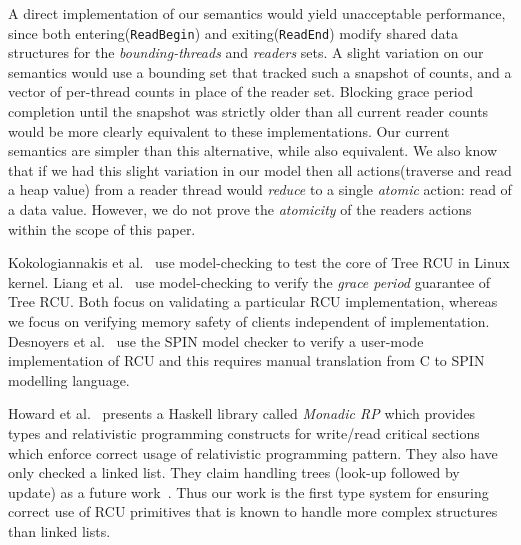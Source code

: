  A direct implementation of our semantics would yield unacceptable performance, since both entering(\lstinline|ReadBegin|) and exiting(\lstinline|ReadEnd|) modify shared data structures for the \textit{bounding-threads} and \textit{readers} sets. A slight variation on our semantics would use a bounding set  that tracked such a snapshot of counts, and a vector of per-thread counts in place of the reader set. Blocking grace period completion until the snapshot was strictly older than all current reader counts would be more clearly equivalent to these implementations. Our current semantics are simpler than this alternative, while also equivalent. We also know that if we had this slight variation in our model then all actions(traverse and read a heap value) from a reader thread would \textit{reduce} to a single \textit{atomic} action: read of a data value. However, we do not prove the \textit{atomicity} of the readers actions within the scope of this paper.

 Kokologiannakis et al.~\cite{Kokologiannakis:2017:SMC:3092282.3092287} use model-checking to test the core of \textsf{Tree RCU} in Linux kernel. Liang et al.~\cite{LiangMKM16} use model-checking to verify the \emph{grace period} guarantee of \textsf{Tree RCU}. Both focus on validating a particular RCU implementation, whereas we focus on verifying memory safety of clients independent of implementation. Desnoyers et al.~\cite{urcu_ieee} use the \textsf{SPIN} model checker to verify a user-mode implementation of RCU and this requires manual translation from C to SPIN modelling language.

Howard et al.~\cite{Howard:2011:RES:2001252.2001267,Cooper2015RelativisticPI} presents a \textsf{Haskell} library called \emph{Monadic RP} which provides types and relativistic programming constructs for write/read critical sections which enforce correct usage of relativistic programming pattern. They also have only checked a linked list. They claim  handling trees (look-up followed by update) as a future work~\cite{Howard:2011:RES:2001252.2001267}. Thus our work is the first type system for ensuring correct use of RCU primitives that is known to handle more complex structures than linked lists.
